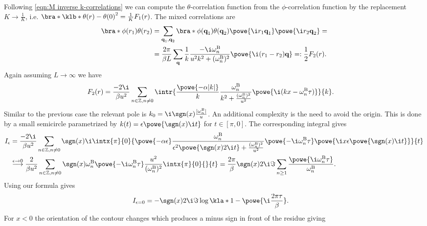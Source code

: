 \documentclass[english, parskip=full]{scrartcl}
\newcommand{\B}{\text{B}}
\begin{document}
Following \autoref{eqn:M inverse k-correlations} we can compute the $\theta$-correlation function from the $\phi$-correlation function by the replacement $K\rightarrow \frac{1}{K}$, i.e. $\bra*{\klb*{\theta(r) - \theta(0)}^2} = \frac{1}{K}F_1(r)$.
The mixed correlations are
\begin{align}
\bra*{\phi(r_1)\theta(r_2)} &= \sum_{\textbf{q}_1, \textbf{q}_2} \bra*{\phi(\textbf{q}_1) \theta(\textbf{q}_2)} \powe{\i r_1\textbf{q}_1} \powe{\i r_2\textbf{q}_2} = \\
&= \frac{2\pi}{\beta L} \sum_{\textbf{q}} \frac{1}{k} \frac{-\i \omega_n^\B}{u^2k^2 + (\omega_n^\B)^2} \powe{\i (r_1-r_2)\textbf{q}} =: \frac{1}{2}F_2(r).
\end{align}
Again assuming $L\rightarrow \infty$ we have
\begin{align}
F_2(r) &= \frac{-2\i}{\beta u^2} \sum_{n\in\mathbb{Z}, n\neq 0} \intr{\frac{\powe{-\alpha |k|}}{k} \frac{\omega_n^\B}{k^2 + \frac{(\omega_n^\B)^2}{u^2}} \powe{\i (kx-\omega_n^\B \tau)} }{k} .
\end{align}
Similar to the previous case the relevant pole is $k_0 = \i \sgn(x) \frac{|\omega_n^\B|}{u}$.
An additional complexity is the need to avoid the origin.
This is done by a small semicircle parametrized by $k(t) = \epsilon \powe{\sgn(x) \i t}$ for $t\in [\pi, 0]$.
The corresponding integral gives
\begin{align}
I_\epsilon &= \frac{-2\i}{\beta u^2} \sum_{n\in\mathbb{Z}, n\neq 0} \sgn(x) \i \intx{\pi}{0}{ \powe{-\alpha \epsilon} \frac{\omega_n^\B}{\epsilon^2 \powe{ \sgn(x)2\i t} + \frac{(\omega_n^\B)^2}{u^2} } \powe{-\i \omega_n^\B\tau} \powe{\i x \epsilon \powe{\sgn(x) \i t}} }{t} \\
&\overset{\epsilon\rightarrow 0}{\longrightarrow} \frac{2}{\beta u^2} \sum_{n\in\mathbb{Z}, n\neq 0} \sgn(x) \omega_n^\B \powe{-\i\omega_n^\B\tau} \frac{u^2}{(\omega_n^\B)^2} \intx{\pi}{0}{ }{t} = \frac{2\pi}{\beta} \sgn(x) 2\i\Im\sum_{n\ge 1} \frac{\powe{\i\omega_n^\B\tau} }{\omega_n^\B}.
\end{align}
Using our formula gives
\begin{align}
I_{\epsilon=0} &= -\sgn(x) 2\i\Im \log \kla*{1 - \powe{\i \frac{2\pi\tau}{\beta}}}.
\end{align}
For $x<0$ the orientation of the contour changes which produces a minus sign in front of the residue giving
\end{document}
